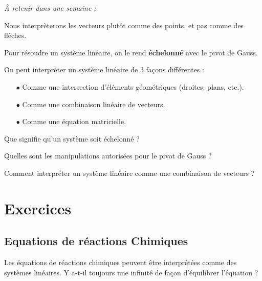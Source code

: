 
\begin{resumeBox}
  \emph{À retenir dans une semaine :} 
  \begin{niceitemize}
    \item Nous interprèterons les vecteurs plutôt comme des points, et pas comme des flèches.
    \item Pour résoudre un système linéaire, on le rend \textbf{échelonné} avec le pivot de Gauss.
    \item On peut interpréter un système linéaire de 3 façons différentes : 
      \begin{itemize}
        \item[$\bullet$] Comme une intersection d'éléments géométriques (droites, plans, etc.).
        \item[$\bullet$] Comme une combinaison linéaire de vecteurs.
        \item[$\bullet$] Comme une équation matricielle.
      \end{itemize}
  \end{niceitemize}
\end{resumeBox}
\begin{rappelsBox}
  \begin{niceitemize}
    \item Que signifie qu'un système soit échelonné ?
    \item Quelles sont les manipulations autorisées pour le pivot de Gauss ?
    \item Comment interpréter un système linéaire comme une combinaison de vecteurs ?
  \end{niceitemize}
\end{rappelsBox}

\section{Exercices}
  \subsection{Equations de réactions Chimiques}
  Les équations de réactions chimiques peuvent être interprétées comme des systèmes linéaires. \newline
  Y a-t-il toujours une infinité de façon d'équilibrer l'équation ?


